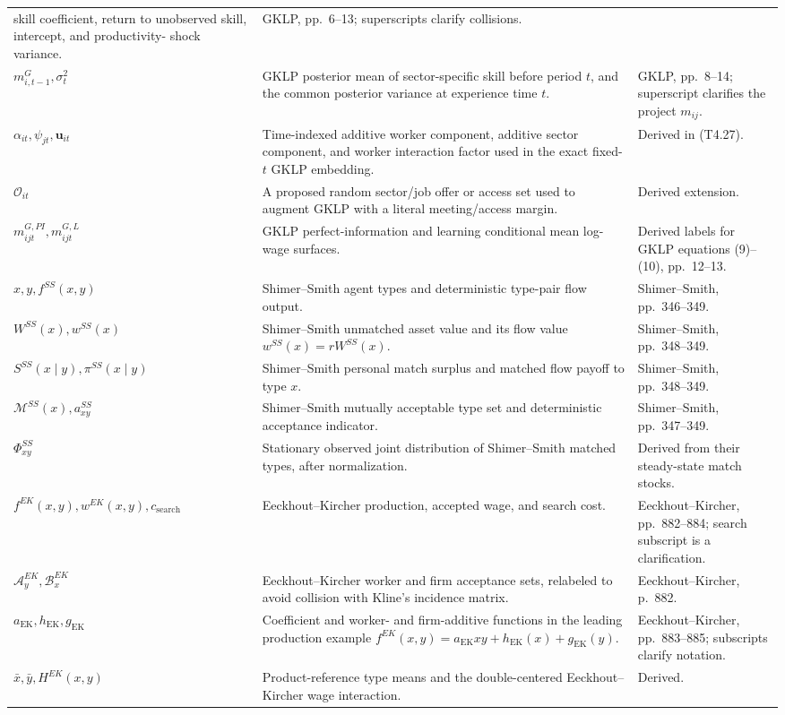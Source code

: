 \documentclass[11pt]{article}
\begin{document}
\begin{longtable}{p{}p{}p{}}
skill coefficient, return to unobserved skill, intercept, and productivity-
shock variance. & GKLP, pp.\ 6--13; superscripts clarify collisions. \\
\(m_{i,t-1}^G,\sigma_t^2\) & GKLP posterior mean of sector-specific skill
before period \(t\), and the common posterior variance at experience time
\(t\). & GKLP, pp.\ 8--14; superscript clarifies the project \(m_{ij}\). \\
\(\alpha_{it},\psi_{jt},\mathbf u_{it}\) & Time-indexed additive worker
component, additive sector component, and worker interaction factor used in
the exact fixed-\(t\) GKLP embedding. & Derived in (T4.27). \\
\(\mathcal O_{it}\) & A proposed random sector/job offer or access set used
to augment GKLP with a literal meeting/access margin. & Derived extension. \\
\(m_{ijt}^{G,PI},m_{ijt}^{G,L}\) & GKLP perfect-information and learning
conditional mean log-wage surfaces. & Derived labels for GKLP equations
(9)--(10), pp.\ 12--13. \\
\(x,y,f^{SS}(x,y)\) & Shimer--Smith agent types and deterministic type-pair
flow output. & Shimer--Smith, pp.\ 346--349. \\
\(W^{SS}(x),w^{SS}(x)\) & Shimer--Smith unmatched asset value and its flow
value \(w^{SS}(x)=rW^{SS}(x)\). & Shimer--Smith, pp.\ 348--349. \\
\(S^{SS}(x\mid y),\pi^{SS}(x\mid y)\) & Shimer--Smith personal match surplus
and matched flow payoff to type \(x\). & Shimer--Smith, pp.\ 348--349. \\
\(\mathcal M^{SS}(x),a^{SS}_{xy}\) & Shimer--Smith mutually acceptable type
set and deterministic acceptance indicator. & Shimer--Smith,
pp.\ 347--349. \\
\(\Phi^{SS}_{xy}\) & Stationary observed joint distribution of
Shimer--Smith matched types, after normalization. & Derived from their
steady-state match stocks. \\
\(f^{EK}(x,y),w^{EK}(x,y),c_{\mathrm{search}}\) & Eeckhout--Kircher
production, accepted wage, and search cost. & Eeckhout--Kircher,
pp.\ 882--884; search subscript is a clarification. \\
\(\mathcal A_y^{EK},\mathcal B_x^{EK}\) & Eeckhout--Kircher worker and firm
acceptance sets, relabeled to avoid collision with Kline's incidence matrix. &
Eeckhout--Kircher, p.\ 882. \\
\(a_{\mathrm{EK}},h_{\mathrm{EK}},g_{\mathrm{EK}}\) & Coefficient and
worker- and firm-additive functions in the leading production example
\(f^{EK}(x,y)=a_{\mathrm{EK}}xy+h_{\mathrm{EK}}(x)+g_{\mathrm{EK}}(y)\). &
Eeckhout--Kircher, pp.\ 883--885; subscripts clarify notation. \\
\(\bar x,\bar y,H^{EK}(x,y)\) & Product-reference type means and the
double-centered Eeckhout--Kircher wage interaction. & Derived. \\
\end{longtable}
\end{document}
